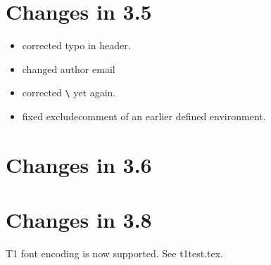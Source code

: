 \documentclass[parskip=false, DIV=8, headings=normal, pagesize=auto]{scrartcl}
\makeatletter
\newcommand*{\cs}[1]{\texttt{\textbackslash#1}}
\newcommand*{\cmd}[1]{\cs{\expandafter\@gobble\string#1}}
\makeatother
\begin{document}
  
\section{Changes in 3.5}

\begin{itemize}
\item corrected typo in header.
\item changed author email
\item corrected \cmd{\specialcomment} yet again.
\item fixed excludecomment of an earlier defined environment.
\end{itemize}


\section{Changes in 3.6}



\section{Changes in 3.8}

T1 font encoding is now supported. See t1test.tex.


\end{document}
